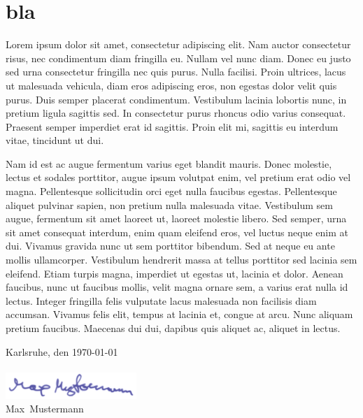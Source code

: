 \documentclass[a4paper,12pt]{article}
\newcommand{\Jahr}{2012 / 2013}         %
\newcommand{\Semester}{Wintersemester}  %
\newcommand{\Datum}{\today}             %
\newcommand{\Ort}{Karlsruhe}
\newcommand{\Vorname}{Max}
\newcommand{\Nachname}{Mustermann}
\begin{document}
 
 \setcounter{page}{2}


\section*{bla}

Lorem ipsum dolor sit amet, consectetur adipiscing elit. Nam auctor consectetur risus, nec condimentum diam fringilla eu. Nullam vel nunc diam. Donec eu justo sed urna consectetur fringilla nec quis purus. Nulla facilisi. Proin ultrices, lacus ut malesuada vehicula, diam eros adipiscing eros, non egestas dolor velit quis purus. Duis semper placerat condimentum. Vestibulum lacinia lobortis nunc, in pretium ligula sagittis sed. In consectetur purus rhoncus odio varius consequat. Praesent semper imperdiet erat id sagittis. Proin elit mi, sagittis eu interdum vitae, tincidunt ut dui.

Nam id est ac augue fermentum varius eget blandit mauris. Donec molestie, lectus et sodales porttitor, augue ipsum volutpat enim, vel pretium erat odio vel magna. Pellentesque sollicitudin orci eget nulla faucibus egestas. Pellentesque aliquet pulvinar sapien, non pretium nulla malesuada vitae. Vestibulum sem augue, fermentum sit amet laoreet ut, laoreet molestie libero. Sed semper, urna sit amet consequat interdum, enim quam eleifend eros, vel luctus neque enim at dui. Vivamus gravida nunc ut sem porttitor bibendum. Sed at neque eu ante mollis ullamcorper. Vestibulum hendrerit massa at tellus porttitor sed lacinia sem eleifend. Etiam turpis magna, imperdiet ut egestas ut, lacinia et dolor. Aenean faucibus, nunc ut faucibus mollis, velit magna ornare sem, a varius erat nulla id lectus. Integer fringilla felis vulputate lacus malesuada non facilisis diam accumsan. Vivamus felis elit, tempus at lacinia et, congue at arcu. Nunc aliquam pretium faucibus. Maecenas dui dui, dapibus quis aliquet ac, aliquet in lectus.


\noindent \Ort, den \Datum\\
\\
\includegraphics[height=10mm]{max-mustermann.pdf}\\
\Vorname~\Nachname
\end{document}
